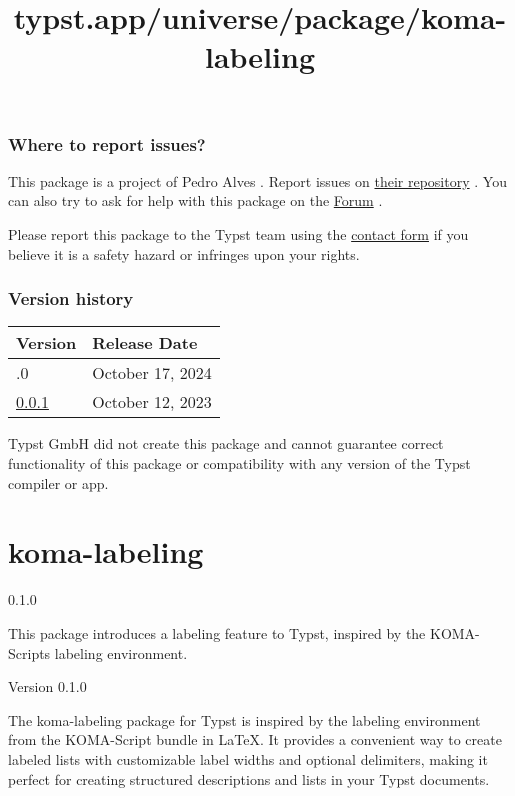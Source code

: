 \subsubsection{Where to report issues?}\label{where-to-report-issues}

This package is a project of Pedro Alves . Report issues on
\href{https://github.com/pta2002/typst-timeliney}{their repository} .
You can also try to ask for help with this package on the
\href{https://forum.typst.app}{Forum} .

Please report this package to the Typst team using the
\href{https://typst.app/contact}{contact form} if you believe it is a
safety hazard or infringes upon your rights.

\label{versions}
\subsubsection{Version history}\label{version-history}

\begin{longtable}[]{@{}ll@{}}
\toprule\noalign{}
Version & Release Date \\
\midrule\noalign{}
\endhead
\bottomrule\noalign{}
\endlastfoot
0.1.0 & October 17, 2024 \\
\href{https://typst.app/universe/package/timeliney/0.0.1/}{0.0.1} &
October 12, 2023 \\
\end{longtable}

Typst GmbH did not create this package and cannot guarantee correct
functionality of this package or compatibility with any version of the
Typst compiler or app.


\title{typst.app/universe/package/koma-labeling}

\label{banner}
\section{koma-labeling}\label{koma-labeling}

{ 0.1.0 }

This package introduces a labeling feature to Typst, inspired by the
KOMA-Script\textquotesingle s labeling environment.

\label{readme}
Version 0.1.0

The koma-labeling package for Typst is inspired by the labeling
environment from the KOMA-Script bundle in LaTeX. It provides a
convenient way to create labeled lists with customizable label widths
and optional delimiters, making it perfect for creating structured
descriptions and lists in your Typst documents.

